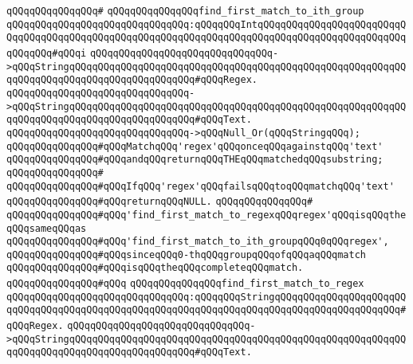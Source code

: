 \verb|qQQqqQQqqQQqqQQq#|\newline
\verb|qQQqqQQqqQQqqQQqfind_first_match_to_ith_group|\newline
\verb|qQQqqQQqqQQqqQQqqQQqqQQqqQQqqQQq:qQQqqQQqIntqQQqqQQqqQQqqQQqqQQqqQQqqQQqqQQqqQQqqQQqqQQqqQQqqQQqqQQqqQQqqQQqqQQqqQQqqQQqqQQqqQQqqQQqqQQqqQQqqQQqqQQq#qQQqi|\newline
\verb|qQQqqQQqqQQqqQQqqQQqqQQqqQQqqQQq->qQQqStringqQQqqQQqqQQqqQQqqQQqqQQqqQQqqQQqqQQqqQQqqQQqqQQqqQQqqQQqqQQqqQQqqQQqqQQqqQQqqQQqqQQqqQQqqQQq#qQQqRegex.|\newline
\verb|qQQqqQQqqQQqqQQqqQQqqQQqqQQqqQQq->qQQqStringqQQqqQQqqQQqqQQqqQQqqQQqqQQqqQQqqQQqqQQqqQQqqQQqqQQqqQQqqQQqqQQqqQQqqQQqqQQqqQQqqQQqqQQqqQQq#qQQqText.|\newline
\verb|qQQqqQQqqQQqqQQqqQQqqQQqqQQqqQQq->qQQqNull_Or(qQQqStringqQQq);|\newline
\newline
\verb|qQQqqQQqqQQqqQQq#qQQqMatchqQQq'regex'qQQqonceqQQqagainstqQQq'text'|\newline
\verb|qQQqqQQqqQQqqQQq#qQQqandqQQqreturnqQQqTHEqQQqmatchedqQQqsubstring;|\newline
\verb|qQQqqQQqqQQqqQQq#|\newline
\verb|qQQqqQQqqQQqqQQq#qQQqIfqQQq'regex'qQQqfailsqQQqtoqQQqmatchqQQq'text'|\newline
\verb|qQQqqQQqqQQqqQQq#qQQqreturnqQQqNULL.|\newline
\verb|qQQqqQQqqQQqqQQq#|\newline
\verb|qQQqqQQqqQQqqQQq#qQQq'find_first_match_to_regexqQQqregex'qQQqisqQQqtheqQQqsameqQQqas|\newline
\verb|qQQqqQQqqQQqqQQq#qQQq'find_first_match_to_ith_groupqQQq0qQQqregex',|\newline
\verb|qQQqqQQqqQQqqQQq#qQQqsinceqQQq0-thqQQqgroupqQQqofqQQqaqQQqmatch|\newline
\verb|qQQqqQQqqQQqqQQq#qQQqisqQQqtheqQQqcompleteqQQqmatch.|\newline
\verb|qQQqqQQqqQQqqQQq#qQQq|\newline
\verb|qQQqqQQqqQQqqQQqfind_first_match_to_regex|\newline
\verb|qQQqqQQqqQQqqQQqqQQqqQQqqQQqqQQq:qQQqqQQqStringqQQqqQQqqQQqqQQqqQQqqQQqqQQqqQQqqQQqqQQqqQQqqQQqqQQqqQQqqQQqqQQqqQQqqQQqqQQqqQQqqQQqqQQqqQQq#qQQqRegex.|\newline
\verb|qQQqqQQqqQQqqQQqqQQqqQQqqQQqqQQq->qQQqStringqQQqqQQqqQQqqQQqqQQqqQQqqQQqqQQqqQQqqQQqqQQqqQQqqQQqqQQqqQQqqQQqqQQqqQQqqQQqqQQqqQQqqQQqqQQq#qQQqText.|\newline
